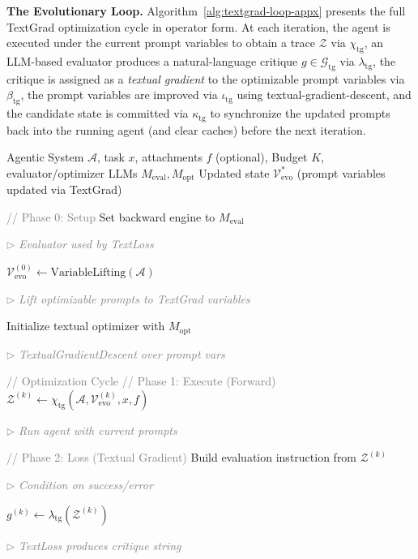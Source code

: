 \textbf{The Evolutionary Loop.}
Algorithm~\ref{alg:textgrad-loop-appx} presents the full TextGrad optimization cycle in operator form. At each iteration, the agent is executed under the current prompt variables to obtain a trace $\mathcal{Z}$ via $\chi_{\mathrm{tg}}$, an LLM-based evaluator produces a natural-language critique $g \in \mathcal{G}_{\mathrm{tg}}$ via $\lambda_{\mathrm{tg}}$, the critique is assigned as a \emph{textual gradient} to the optimizable prompt variables via $\beta_{\mathrm{tg}}$, the prompt variables are improved via $\iota_{\mathrm{tg}}$ using textual-gradient-descent, and the candidate state is committed via $\kappa_{\mathrm{tg}}$ to synchronize the updated prompts back into the running agent (and clear caches) before the next iteration.

\begin{algorithm}[t]
  \caption{TextGrad Prompt Optimization Loop}
  \label{alg:textgrad-loop-appx}
  \newcommand{\algcommenttg}[1]{\hfill\parbox[t]{0.48\linewidth}{\raggedleft\footnotesize\textcolor{gray}{$\rhd$ \textit{#1}}}}
  \begin{algorithmic}[1]
  \renewcommand{\algorithmicrequire}{\textbf{Input:}}
  \renewcommand{\algorithmicensure}{\textbf{Output:}}
  \REQUIRE Agentic System $\mathcal{A}$, task $x$, attachments $f$ (optional), Budget $K$, evaluator/optimizer LLMs $M_{\text{eval}}, M_{\text{opt}}$
  \ENSURE Updated state $\mathcal{V}_{\text{evo}}^{*}$ (prompt variables updated via TextGrad)

  \STATE \textcolor{gray}{// Phase 0: Setup}
  \STATE Set backward engine to $M_{\text{eval}}$ \algcommenttg{Evaluator used by TextLoss}
  \STATE $\mathcal{V}_{\text{evo}}^{(0)} \leftarrow \text{VariableLifting}(\mathcal{A})$ \algcommenttg{Lift optimizable prompts to TextGrad variables}
  \STATE Initialize textual optimizer with $M_{\text{opt}}$ \algcommenttg{TextualGradientDescent over prompt vars}

  \vspace{0.2em}
  \STATE \textcolor{gray}{// Optimization Cycle}
      \STATE \textcolor{gray}{// Phase 1: Execute (Forward)}
      \STATE $\mathcal{Z}^{(k)} \leftarrow \chi_{\mathrm{tg}}(\mathcal{A}, \mathcal{V}_{\text{evo}}^{(k)}, x, f)$ \algcommenttg{Run agent with current prompts}
      
      \vspace{0.1em}
      \STATE \textcolor{gray}{// Phase 2: Loss (Textual Gradient)}
      \STATE Build evaluation instruction from $\mathcal{Z}^{(k)}$ \algcommenttg{Condition on success/error}
      \STATE $g^{(k)} \leftarrow \lambda_{\mathrm{tg}}(\mathcal{Z}^{(k)})$ \algcommenttg{TextLoss produces critique string}
      

\end{algorithmic}
\end{algorithm}
